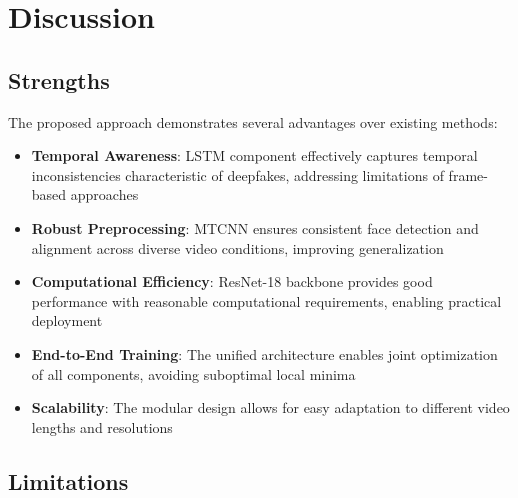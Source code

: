 \documentclass[conference]{IEEEtran}
\begin{document}
\section{Discussion}

\subsection{Strengths}

The proposed approach demonstrates several advantages over existing methods:
\begin{itemize}
\item \textbf{Temporal Awareness}: LSTM component effectively captures temporal inconsistencies characteristic of deepfakes, addressing limitations of frame-based approaches \cite{choi2020temporal}
\item \textbf{Robust Preprocessing}: MTCNN ensures consistent face detection and alignment across diverse video conditions, improving generalization \cite{zhang2016joint}
\item \textbf{Computational Efficiency}: ResNet-18 backbone provides good performance with reasonable computational requirements, enabling practical deployment \cite{howard2017mobilenets}
\item \textbf{End-to-End Training}: The unified architecture enables joint optimization of all components, avoiding suboptimal local minima \cite{lecun2015deep}
\item \textbf{Scalability}: The modular design allows for easy adaptation to different video lengths and resolutions \cite{simonyan2014very}
\end{itemize}

\subsection{Limitations}
\end{document}
